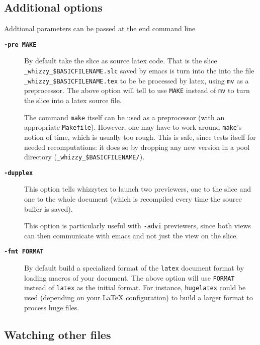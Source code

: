 \documentclass{article}
\let \lst \verb
\let \whizzy \WhizzyTeX
\begin{document}
\subsection {Additional options}

Addtional parameters can be passed at the end command line

\begin{description}
\item[{\bf {\tt -pre MAKE}}]\indent
\label {make}

By default {\whizzy} take the slice as source latex code. 
That is the slice 
\lst"_whizzy_$BASICFILENAME.slc" saved by emacs is turn into the 
into the file \lst"_whizzy_$BASICFILENAME.tex" to be be processed by latex,
using \lst"mv" as a preprocessor.  The above option will tell {\whizzy} to
use \lst"MAKE" instead of \lst"mv" to turn the slice into a latex source
file.

The command \lst"make" itself can be used as a preprocessor (with an
appropriate \lst"Makefile").  However, one may have to work around
\lst"make"'s notion of time, which is usually too rough. 
This is safe, since
{\whizzy} tests itself for needed recomputations: it does so by dropping any
new version in a pool directory (\lst"_whizzy_$BASICFILENAME/"). %

\item[{\bf {\tt -dupplex}}]\indent
\label {dupplex}

This option tells whizzytex to launch two previewers, one to the slice and
one to the whole document (which is recompiled every time the source buffer
is saved).

This option is particularly useful with \lst"-advi" previewers, since both
views can then communicate with emacs and not just the view on the slice.

\item[{\bf {\tt -fmt FORMAT}}]\indent

By default {\whizzy} build a specialized format of the \lst"latex" document
format by loading macros of your document.  The above option will use
\lst"FORMAT" instead of \lst"latex" as the initial format. For instance,
\lst"hugelatex" could be used (depending on your {\LaTeX} configuration) to
build a larger format to process huge files.

\end{description}



\subsection {Watching other files}
\end{document}
